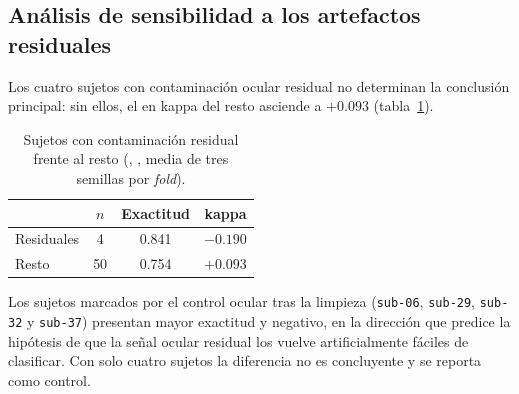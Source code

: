 \subsection{Análisis de sensibilidad a los artefactos residuales}
\label{sec:sensibilidad}

Los cuatro sujetos con contaminación ocular residual no determinan la conclusión principal: sin
ellos, el \dsi{} en kappa del resto asciende a $+0.093$ (tabla~\ref{tab:sensibilidad}).

\begin{table}[H]
\centering
\caption{Sujetos con contaminación residual frente al resto (\eegnet{}, \loso{}, media de tres semillas por \textit{fold}).}
\label{tab:sensibilidad}
\begin{tabular}{lccc}
\toprule
 & \textbf{$n$} & \textbf{Exactitud \loso{}} & \textbf{\dsi{} kappa} \\
\midrule
Residuales & 4  & 0.841 & $-0.190$ \\
Resto      & 50 & 0.754 & $+0.093$ \\
\bottomrule
\end{tabular}
\end{table}

Los sujetos marcados por el control ocular tras la limpieza (\texttt{sub-06}, \texttt{sub-29},
\texttt{sub-32} y \texttt{sub-37}) presentan mayor exactitud y \dsi{} negativo, en la dirección que
predice la hipótesis de que la señal ocular residual los vuelve artificialmente fáciles de clasificar.
Con solo cuatro sujetos la diferencia no es concluyente y se reporta como control.


